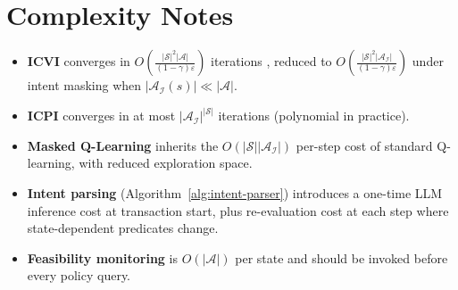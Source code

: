 \documentclass[12pt]{article}
\newcommand{\cS}{\mathcal{S}}
\newcommand{\cA}{\mathcal{A}}
\newcommand{\cI}{\mathcal{I}}
\begin{document}
\section{Complexity Notes}
\label{sec:complexity}

\begin{itemize}[leftmargin=*]
  \item \textbf{ICVI} converges in $O\!\left(\frac{|\cS|^2 |\cA|}{(1-\gamma)\varepsilon}\right)$
  iterations \citep{puterman1994}, reduced to
  $O\!\left(\frac{|\cS|^2 |\cA_\cI|}{(1-\gamma)\varepsilon}\right)$ under
  intent masking when $|\cA_\cI(s)| \ll |\cA|$.

  \item \textbf{ICPI} converges in at most $|\cA_\cI|^{|\cS|}$ iterations
  (polynomial in practice).

  \item \textbf{Masked Q-Learning} inherits the $O(|\cS||\cA_\cI|)$ per-step
  cost of standard Q-learning, with reduced exploration space.

  \item \textbf{Intent parsing} (Algorithm~\ref{alg:intent-parser}) introduces
  a one-time LLM inference cost at transaction start, plus re-evaluation cost
  at each step where state-dependent predicates change.

  \item \textbf{Feasibility monitoring} is $O(|\cA|)$ per state and should be
  invoked before every policy query.
\end{itemize}



\end{document}
